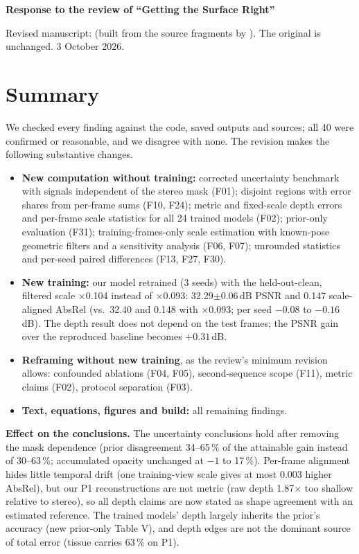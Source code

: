 \documentclass[10pt,a4paper]{article}
\begin{document}
{\Large\bfseries Response to the review of ``Getting the Surface Right''}\par
\vspace{2mm}
Revised manuscript:  (built from the source fragments by ). The original  is unchanged. 3 October 2026.

\section*{Summary}
We checked every finding against the code, saved outputs and sources; all 40 were confirmed or reasonable, and we disagree with none. The revision makes the following substantive changes.
\begin{itemize}
\item \textbf{New computation without training:} corrected uncertainty benchmark with signals independent of the stereo mask (F01); disjoint regions with error shares from per-frame sums (F10, F24); metric and fixed-scale depth errors and per-frame scale statistics for all 24 trained models (F02); prior-only evaluation (F31); training-frames-only scale estimation with known-pose geometric filters and a sensitivity analysis (F06, F07); unrounded statistics and per-seed paired differences (F13, F27, F30).
\item \textbf{New training:} our model retrained (3 seeds) with the held-out-clean, filtered scale $\times$0.104 instead of $\times$0.093: 32.29$\pm$0.06\,dB PSNR and 0.147 scale-aligned AbsRel (vs.\ 32.40 and 0.148 with $\times$0.093; per seed $-0.08$ to $-0.16$\,dB). The depth result does not depend on the test frames; the PSNR gain over the reproduced baseline becomes $+0.31$\,dB.
\item \textbf{Reframing without new training}, as the review's minimum revision allows: confounded ablations (F04, F05), second-sequence scope (F11), metric claims (F02), protocol separation (F03).
\item \textbf{Text, equations, figures and build:} all remaining findings.
\end{itemize}
\textbf{Effect on the conclusions.} The uncertainty conclusions hold after removing the mask dependence (prior disagreement 34--65\,\% of the attainable gain instead of 30--63\,\%; accumulated opacity unchanged at $-1$ to 17\,\%). Per-frame alignment hides little temporal drift (one training-view scale gives at most 0.003 higher AbsRel), but our P1 reconstructions are not metric (raw depth 1.87$\times$ too shallow relative to stereo), so all depth claims are now stated as shape agreement with an estimated reference. The trained models' depth largely inherits the prior's accuracy (new prior-only Table V), and depth edges are not the dominant source of total error (tissue carries 63\,\% on P1).
\end{document}
